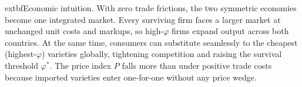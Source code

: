 \begin{solution}
\bigskip
	extbf{Economic intuition.}
With zero trade frictions, the two symmetric economies become one integrated market. Every surviving firm faces a larger market at unchanged unit costs and markups, so high-$\varphi$ firms expand output across both countries. At the same time, consumers can substitute seamlessly to the cheapest (highest-$\varphi$) varieties globally, tightening competition and raising the survival threshold $\varphi^*$. The price index $P$ falls more than under positive trade costs because imported varieties enter one-for-one without any price wedge.

\medskip
\noindent{}
\end{solution}